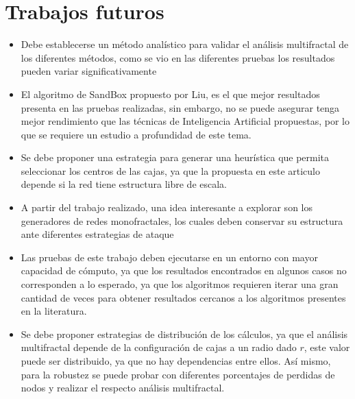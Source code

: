 \newpage
\section{Trabajos futuros}

\begin{itemize}
    \item Debe establecerse un método analístico para validar el análisis multifractal de los diferentes métodos, como se vio en las diferentes pruebas los resultados pueden variar significativamente
    \item El algoritmo de SandBox propuesto por Liu\cite{Liu2015}, es el que mejor resultados presenta en las pruebas realizadas, sin embargo, no se puede asegurar tenga mejor rendimiento que las técnicas de Inteligencia Artificial propuestas, por lo que se requiere un estudio a profundidad de este tema.
    \item Se debe proponer una estrategia para generar una heurística que permita seleccionar los centros de las cajas, ya que la propuesta en este articulo depende si la red tiene estructura libre de escala.
    \item A partir del trabajo realizado, una idea interesante a explorar son los generadores de redes monofractales, los cuales deben conservar su estructura ante diferentes estrategias de ataque
    \item Las pruebas de este trabajo deben ejecutarse en un entorno con mayor capacidad de cómputo, ya que los resultados encontrados en algunos casos no corresponden a lo esperado, ya que los algoritmos requieren iterar una gran cantidad de veces para obtener resultados cercanos a los algoritmos presentes en la literatura.
    \item Se debe proponer estrategias de distribución de los cálculos, ya que el análisis multifractal depende de la configuración de cajas a un radio dado $r$, este valor puede ser distribuido, ya que no hay dependencias entre ellos. Así mismo, para la robustez se puede probar con diferentes porcentajes de perdidas de nodos y realizar el respecto análisis multifractal.
\end{itemize}












